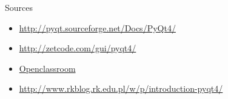 \documentclass[9pt, french, brown]{beamer}
\newcommand{\mytitle}[1]{{\color{brown}#1 \\~\\}}
\begin{document}


\begin{frame}{Sources}
\begin{itemize}
\item \url{http://pyqt.sourceforge.net/Docs/PyQt4/}
\item \url{http://zetcode.com/gui/pyqt4/}
\item \href{http://openclassrooms.com/courses/programmez-avec-le-langage-c/introduction-a-qt}{Openclassroom}
\item \url{http://www.rkblog.rk.edu.pl/w/p/introduction-pyqt4/}
\end{itemize}
\end{frame}
\end{document}

